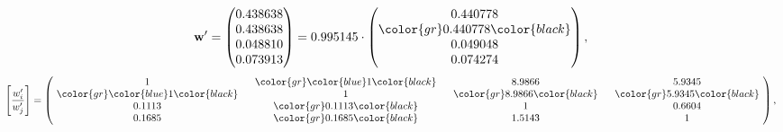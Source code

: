 \begin{example}
\begin{equation*}
\mathbf{w}^{\prime} =
\begin{pmatrix}
0.438638\\
0.438638\\
0.048810\\
0.073913
\end{pmatrix} =
0.995145\cdot
\begin{pmatrix}
0.440778\\
\color{gr} 0.440778\color{black} \\
0.049048\\
0.074274
\end{pmatrix},
\end{equation*}
\begin{equation*}
\left[ \frac{{w}^{\prime}_i}{{w}^{\prime}_j} \right] =
\begin{pmatrix}
$\,\,$ 1 $\,\,$ & $\,\,$\color{gr} \color{blue} 1\color{black} $\,\,$ & $\,\,$8.9866$\,\,$ & $\,\,$5.9345$\,\,$ \\
$\,\,$\color{gr} \color{blue} 1\color{black} $\,\,$ & $\,\,$ 1 $\,\,$ & $\,\,$\color{gr} 8.9866\color{black} $\,\,$ & $\,\,$\color{gr} 5.9345\color{black}   $\,\,$ \\
$\,\,$0.1113$\,\,$ & $\,\,$\color{gr} 0.1113\color{black} $\,\,$ & $\,\,$ 1 $\,\,$ & $\,\,$0.6604 $\,\,$ \\
$\,\,$0.1685$\,\,$ & $\,\,$\color{gr} 0.1685\color{black} $\,\,$ & $\,\,$1.5143$\,\,$ & $\,\,$ 1  $\,\,$ \\
\end{pmatrix},
\end{equation*}
\end{example}
\newpage
